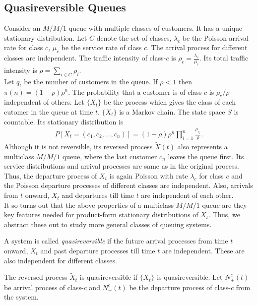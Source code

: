\documentclass[all-lectures.tex]{subfiles}
\begin{document}
\subsection{Quasireversible Queues}
\indent Consider an $M/M/1$ queue with multiple classes of customers. It has a unique stationary distribution. Let $C$ denote the set of classes, $\lambda_c$ be the Poisson arrival rate for class $c$, $\mu_c$ be the service rate of class $c$. The arrival process for different classes are independent. The traffic intensity of class-$c$ is $\rho_c = \frac{\lambda_c}{\mu_c}$. Its total traffic intensity is $\rho = \sum_{i \in C} \rho_i$. \\
\indent Let $q_t$ be the number of customers in the queue. If $\rho < 1$ then $\pi(n) = (1-\rho) \rho^n$. The probability that a customer is of class-$c$ is ${\rho_c}/{\rho}$ independent of others. Let $\{X_t\}$ be the process which gives the class of each cutomer in the queue at time $t$. $\{X_t\}$ is a Markov  chain. The state space $S$ is countable. Its stationary distribution is 
\begin{align}\label{eq:prod_form_nets_multiclass}
P[X_t = (c_1, c_2, \dots, c_n)] = (1-\rho) \rho^n \prod_{i=1}^{n} \frac{\rho_{c_i}}{\rho}.
\end{align}
Although it is not reversible, its reversed process $\tilde{X}(t)$ also represents a multiclass $M/M/1$ queue, where the last customer $c_n$ leaves the queue first. Its service distributions and arrival processes are same as in the original process. Thus, the departure process of $X_t$ is again Poisson with rate $\lambda_c$ for class $c$ and the Poisson departure processes of different classes are independent. Also, arrivals from $t$ onward, $X_t$ and departures till time $t$ are independent of each other. \\
\indent It so turns out that the above properties of a multiclass $M/M/1$ queue are they key features needed for product-form stationary distributions of $X_t$.  Thus, we abstract these out to study more general classes of queuing systems.
\begin{defn}
A system is called \textit{quasireversible }if the future arrival processes from time $t$ onward, $X_t$ and past departure processes till time $t$ are independent. These are also independent for different classes.
\end{defn}
\indent The reversed process $\tilde{X}_t$ is quasireversible if $\{X_t\}$ is quasireversible. Let $N_+^c (t)$ be arrival process of class-$c$ and $N_-^c (t)$ be the departure process of class-$c$ from the system.
\end{document}
